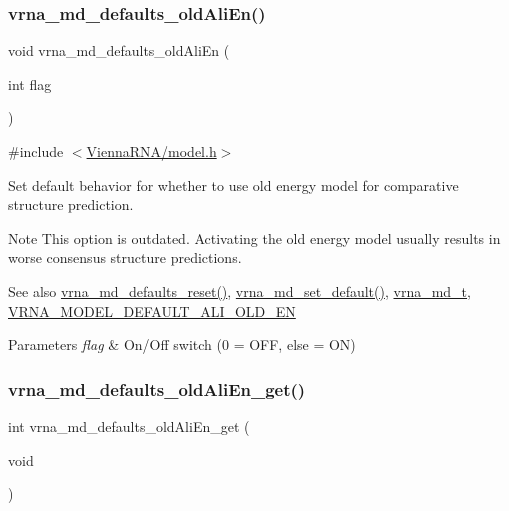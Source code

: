 \subsubsection{\texorpdfstring{vrna\+\_\+md\+\_\+defaults\+\_\+old\+Ali\+En()}{vrna\_md\_defaults\_oldAliEn()}}
{\footnotesize\ttfamily void vrna\+\_\+md\+\_\+defaults\+\_\+old\+Ali\+En (\begin{DoxyParamCaption}\item[{int}]{flag }\end{DoxyParamCaption})}



{\ttfamily \#include $<$\hyperlink{model_8h}{Vienna\+R\+N\+A/model.\+h}$>$}



Set default behavior for whether to use old energy model for comparative structure prediction. 

\begin{DoxyNote}{Note}
This option is outdated. Activating the old energy model usually results in worse consensus structure predictions. 
\end{DoxyNote}
\begin{DoxySeeAlso}{See also}
\hyperlink{group__model__details_ga70834424cf804d149937de89f80ceb45}{vrna\+\_\+md\+\_\+defaults\+\_\+reset()}, \hyperlink{group__model__details_ga8ac6ff84936282436f822644bf841f66}{vrna\+\_\+md\+\_\+set\+\_\+default()}, \hyperlink{group__model__details_ga1f8a10e12a0a1915f2a4eff0b28ea17c}{vrna\+\_\+md\+\_\+t}, \hyperlink{group__model__details_ga2a5bbfc1edf33077e39466d2d9807115}{V\+R\+N\+A\+\_\+\+M\+O\+D\+E\+L\+\_\+\+D\+E\+F\+A\+U\+L\+T\+\_\+\+A\+L\+I\+\_\+\+O\+L\+D\+\_\+\+EN} 
\end{DoxySeeAlso}

\begin{DoxyParams}{Parameters}
{\em flag} & On/\+Off switch (0 = O\+FF, else = ON) \\
\hline
\end{DoxyParams}
\mbox{\label{group__model__details_ga2374492b5019df88022fe4c05f0f3630}} 
\subsubsection{\texorpdfstring{vrna\+\_\+md\+\_\+defaults\+\_\+old\+Ali\+En\+\_\+get()}{vrna\_md\_defaults\_oldAliEn\_get()}}
{\footnotesize\ttfamily int vrna\+\_\+md\+\_\+defaults\+\_\+old\+Ali\+En\+\_\+get (\begin{DoxyParamCaption}\item[{void}]{ }\end{DoxyParamCaption})}



